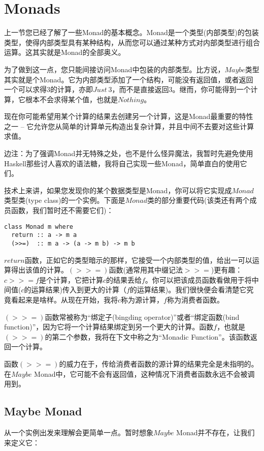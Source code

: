 \section{Monads}
上一节您已经了解了一些Monad的基本概念。Monad是一个类型(内部类型)的包装类型，使得内部类型具有某种结构，从而您可以通过某种方式对内部类型进行组合运算。这其实就是Monad的全部奥义。

为了做到这一点，您只能间接访问Monad中包装的内部类型。比方说，$Maybe$类型其实就是个Monad。它为内部类型添加了一个结构，可能没有返回值，或者返回一个可以求得$3$的计算，亦即$Just\ 3$，而不是直接返回$3$。继而，你可能得到一个计算，它根本不会求得某个值，也就是$Nothing$。

现在你可能希望用某个计算的结果去创建另一个计算，这是Monad最重要的特性之一 -- 它允许您从简单的计算单元构造出复杂计算，并且中间不去要对这些计算求值。

边注：为了强调Monad并无特殊之处，也不是什么怪异魔法，我暂时先避免使用Haskell那些讨人喜欢的语法糖，我将自己实现一些Monad，简单直白的使用它们。

技术上来讲，如果您发现你的某个数据类型是Monad，你可以将它实现成$Monad$类型类(type class)的一个实例。下面是$Monad$类的部分重要代码(该类还有两个成员函数，我们暂时还不需要它们)：

\begin{lstlisting}
class Monad m where
  return :: a -> m a
  (>>=)  :: m a -> (a -> m b) -> m b
\end{lstlisting}


$return$函数，正如它的类型暗示的那样，它接受一个内部类型的值，给出一可以运算得出该值的计算。$(>>=)$函数(通常用其中缀记法$>>=$)更有趣： $c >>= f$是个计算，它把计算$c$的结果丢给$f$。你可以把该成员函数看做用于将中间值($c$的运算结果)传入到更大的计算（$f$的运算结果)。我们很快便会看清楚它究竟看起来是啥样。从现在开始，我将$c$称为源计算，$f$称为消费者函数。

$(>>=)$函数常被称为“绑定子(bingding operator)”或者“绑定函数(bind function)”，因为它将一个计算结果绑定到另一个更大的计算。函数$f$，也就是$(>>=)$的第二个参数，我将在下文中称之为``Monadic Function''。该函数返回一个计算。

函数$(>>=)$的威力在于，传给消费者函数的源计算的结果完全是未指明的。在$Maybe$ Monad中，它可能不会有返回值，这种情况下消费者函数永远不会被调用到。

\subsection{Maybe Monad}

从一个实例出发来理解会更简单一点。暂时想象$Maybe$ Monad并不存在，让我们来定义它：

